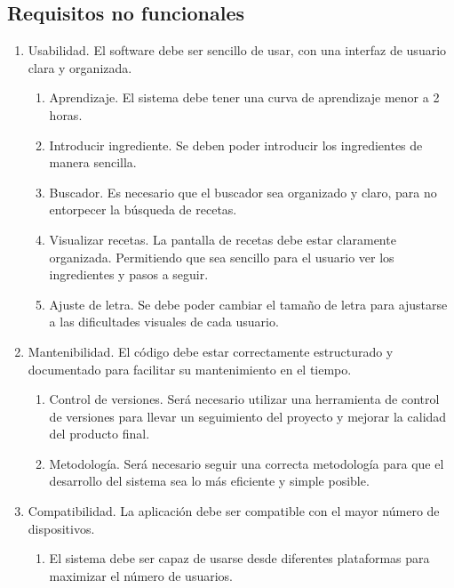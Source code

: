 \subsection{Requisitos no funcionales}
\begin{enumerate}[label=RNF\arabic*,leftmargin=2cm]
    \item Usabilidad. El software debe ser sencillo de usar, con una interfaz de usuario clara y organizada.
    \begin{enumerate}[label=RNF1.]
        \item Aprendizaje. El sistema debe tener una curva de aprendizaje menor a 2 horas. 
        \item Introducir ingrediente. Se deben poder introducir los ingredientes de manera sencilla. 
        \item Buscador. Es necesario que el buscador sea organizado y claro, para no entorpecer la búsqueda de recetas. 
        \item Visualizar recetas. La pantalla de recetas debe estar claramente organizada. Permitiendo que sea sencillo para el usuario ver los ingredientes y pasos a seguir. 
        \item Ajuste de letra. Se debe poder cambiar el tamaño de letra para ajustarse a las dificultades visuales de cada usuario.
    \end{enumerate}
    \item Mantenibilidad. El código debe estar correctamente estructurado y documentado para facilitar su mantenimiento en el tiempo.
    \begin{enumerate}[label=RNF2.\arabic*]
        \item Control de versiones. Será necesario utilizar una herramienta de control de versiones para llevar un seguimiento del proyecto y mejorar la calidad del producto final.
        \item Metodología. Será necesario seguir una correcta metodología para que el desarrollo del sistema sea lo más eficiente y simple posible.
    \end{enumerate}
    \item Compatibilidad. La aplicación debe ser compatible con el mayor número de dispositivos.
    \begin{enumerate}[label=RNF3.\arabic*]
        \item El sistema debe ser capaz de usarse desde diferentes plataformas para maximizar el número de usuarios.
    \end{enumerate}
    
    
\end{enumerate}

